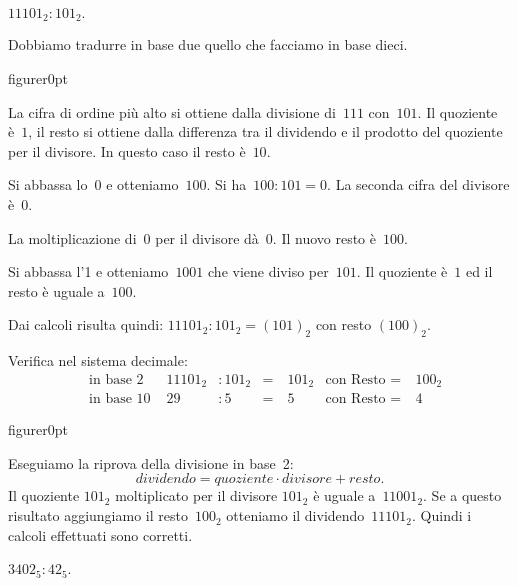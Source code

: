 \begin{exrig}

\begin{esempio}
$11101_{2}:101_{2}.$
\end{esempio}
Dobbiamo tradurre in base due quello che facciamo in base dieci.

\begin{wrapfloat}{figure}{r}{0pt}

\end{wrapfloat}

La cifra di ordine più alto si ottiene dalla divisione di~$111$ con~$101$.
Il quoziente è~$1$, il resto si ottiene dalla differenza tra
il dividendo e il prodotto del quoziente per il divisore. In questo
caso il resto è~$10$.

Si abbassa lo~$0$ e otteniamo~$100$. Si ha~$100:101=0$. La seconda
cifra del divisore è~$0$.

La moltiplicazione di~$0$ per il divisore dà~$0$. Il nuovo resto è~$100$.

Si abbassa l'1 e otteniamo~$1001$ che viene diviso per~$101$. Il quoziente è~$1$
ed il resto è uguale a~$100$.

Dai calcoli risulta quindi: $11101_{2}:101_{2} = (101)_2$ con resto $(100)_2$.

Verifica nel sistema decimale:
\begin{align*}
&\text{in base 2 }&11101_{2}&:101_{2}&=&~101_{2}&\text{con Resto }=&~100_{2}\\
&\text{in base 10 }&29&:5&=&~5&\text{con Resto }= &~4
\end{align*}

\begin{wrapfloat}{figure}{r}{0pt}

\end{wrapfloat}
Eseguiamo la riprova della divisione in base~2:
\[\mathit{dividendo}=\mathit{quoziente}\cdot\mathit{divisore}+\mathit{resto}.\]
Il quoziente $101_2$ moltiplicato per il divisore $101_2$ è uguale a~$11001_2$.
Se a questo risultato aggiungiamo il resto~$100_2$ otteniamo il dividendo~$11101_2$. Quindi i calcoli effettuati sono corretti.

\begin{esempio}
$3402_{5}:42_{5}$.
\end{esempio}


\end{exrig}
